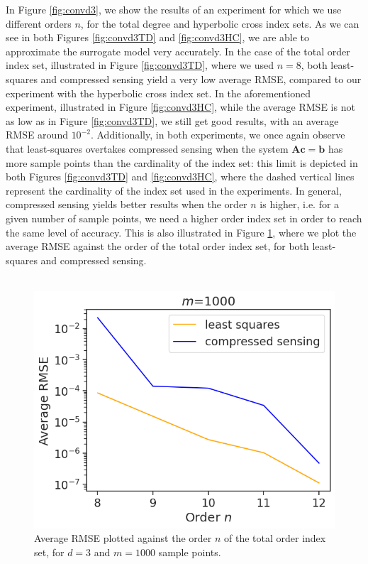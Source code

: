 \documentclass[12pt, oneside]{report}   	%
\begin{document}
\noindent In Figure \ref{fig:convd3}, we show the results of an experiment for which we use different orders $n$, for the total degree and hyperbolic cross index sets. As we can see in both Figures \ref{fig:convd3TD} and \ref{fig:convd3HC}, we are able to approximate the surrogate model very accurately. In the case of the total order index set, illustrated in Figure \ref{fig:convd3TD}, where we used $n=8$, both least-squares and compressed sensing yield a very low average RMSE, compared to our experiment with the hyperbolic cross index set. In the aforementioned experiment, illustrated in Figure \ref{fig:convd3HC}, while the average RMSE is not as low as in Figure \ref{fig:convd3TD}, we still get good results, with an average RMSE around $10^{-2}$. Additionally, in both experiments, we once again observe that least-squares overtakes compressed sensing when the system $\boldsymbol{Ac}=\boldsymbol{b}$ has more sample points than the cardinality of the index set: this limit is depicted in both Figures \ref{fig:convd3TD} and \ref{fig:convd3HC}, where the dashed vertical lines represent the cardinality of the index set used in the experiments. In general, compressed sensing yields better results when the order $n$ is higher, i.e. for a given number of sample points, we need a higher order index set in order to reach the same level of accuracy. This is also illustrated in Figure \ref{fig:errvordd3}, where we plot the average RMSE against the order of the total order index set, for both least-squares and compressed sensing.\\\\
\begin{figure}[t]
    \centering
    \includegraphics[scale=0.6]{errvsord_d3.png}
    \caption{Average RMSE plotted against the order $n$ of the total order index set, for $d=3$ and $m=1000$ sample points.}
    \label{fig:errvordd3}
\end{figure}
\end{document}
